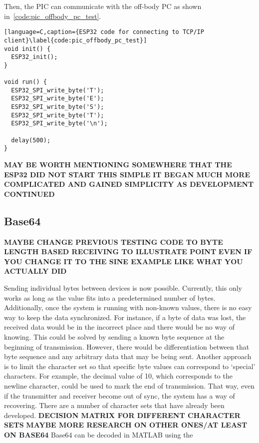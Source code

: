 Then, the PIC can communicate with the off-body PC as shown in~\autoref{code:pic_offbody_pc_test}.

\begin{lstlisting}[language=C,caption={ESP32 code for connecting to TCP/IP client}\label{code:pic_offbody_pc_test}]
void init() {
  ESP32_init();
}

void run() {
  ESP32_SPI_write_byte('T');
  ESP32_SPI_write_byte('E');
  ESP32_SPI_write_byte('S');
  ESP32_SPI_write_byte('T');
  ESP32_SPI_write_byte('\n');

  delay(500);
}
\end{lstlisting}

\textbf{MAY BE WORTH MENTIONING SOMEWHERE THAT THE ESP32 DID NOT START THIS SIMPLE}
\textbf{IT BEGAN MUCH MORE COMPLICATED AND GAINED SIMPLICITY AS DEVELOPMENT CONTINUED}


\subsection{Base64}
\textbf{MAYBE CHANGE PREVIOUS TESTING CODE TO BYTE LENGTH BASED RECEIVING TO ILLUSTRATE POINT}
\textbf{EVEN IF YOU CHANGE IT TO THE SINE EXAMPLE LIKE WHAT YOU ACTUALLY DID}

Sending individual bytes between devices is now possible.
Currently, this only works as long as the value fits into a predetermined number of bytes.
Additionally, once the system is running with non-known values, there is no easy way to keep the data synchronized.
For instance, if a byte of data was lost, the received data would be in the incorrect place
and there would be no way of knowing.
This could be solved by sending a known byte sequence at the beginning of transmission.
However, there would be differentiation between that byte sequence and any arbitrary data that may be being sent.
Another approach is to limit the character set so that specific byte values can correspond to `special' characters.
For example, the decimal value of 10, which corresponds to the newline character, could be used to mark the end of transmission.
That way, even if the transmitter and receiver become out of sync, the system has a way of recovering.
There are a number of character sets that have already been developed.
\textbf{DECISION MATRIX FOR DIFFERENT CHARACTER SETS}
\textbf{MAYBE MORE RESEARCH ON OTHER ONES/AT LEAST ON BASE64}
Base64 can be decoded in MATLAB using the

